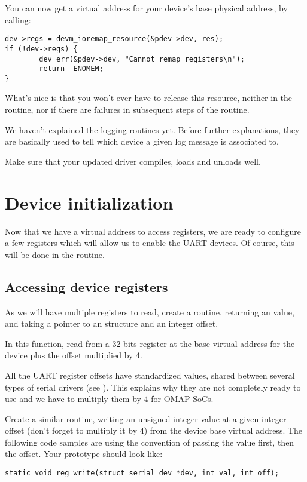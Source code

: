 You can now get a virtual address for your device's base physical
address, by calling:

\begin{verbatim}
dev->regs = devm_ioremap_resource(&pdev->dev, res);
if (!dev->regs) {
        dev_err(&pdev->dev, "Cannot remap registers\n");
        return -ENOMEM;
}
\end{verbatim}

What's nice is that you won't ever have to release this resource,
neither in the  routine, nor if there are failures
in subsequent steps of the  routine.

We haven't explained the  logging routines yet.
Before further explanations, they are basically used to tell which
device a given log message is associated to. 

Make sure that your updated driver compiles, loads and unloads well.

\section{Device initialization}

Now that we have a virtual address to access registers, we are ready to
configure a few registers which will allow us to enable the UART
devices. Of course, this will be done in the  routine.

\subsection{Accessing device registers}

As we will have multiple registers to read, create a 
routine, returning an  value, and  taking a 
pointer to an  structure and an  integer
offset.

In this function, read from a 32 bits register at the base virtual
address for the device plus the offset multiplied by 4.

All the UART register offsets have standardized values, shared between
several types of serial drivers (see
). This explains why they are not
completely ready to use and we have to multiply them by 4 for OMAP SoCs.

Create a similar  routine, writing an unsigned integer
value at a given integer offset (don't forget to multiply it by 4) from
the device base virtual address. The following code samples are using
the  convention of passing the value first, then the
offset. Your prototype should look like:
\begin{verbatim}
static void reg_write(struct serial_dev *dev, int val, int off);
\end{verbatim}

